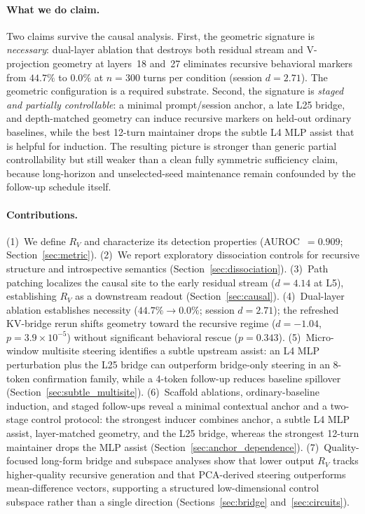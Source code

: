 \documentclass{article}
\newcommand{\RV}{R_V}
\newcommand{\dcohen}{d}
\begin{document}
\paragraph{What we do claim.}
Two claims survive the causal analysis.
First, the geometric signature is \emph{necessary}: dual-layer ablation that destroys both residual
stream and V-projection geometry at layers~18 and~27 eliminates recursive behavioral markers
from $44.7\%$ to $0.0\%$ at $n{=}300$ turns per condition (session $\dcohen = 2.71$).
The geometric configuration is a required substrate.
Second, the signature is \emph{staged and partially controllable}: a minimal prompt/session
anchor, a late L25 bridge, and depth-matched geometry can induce recursive markers on held-out
ordinary baselines, while the best 12-turn maintainer drops the subtle L4 MLP assist that is
helpful for induction.
The resulting picture is stronger than generic partial controllability but still weaker than a clean
fully symmetric sufficiency claim, because long-horizon and unselected-seed maintenance remain
confounded by the follow-up schedule itself.

\paragraph{Contributions.}
(1)~We define $\RV$ and characterize its detection properties (AUROC~$= 0.909$;
Section~\ref{sec:metric}).
(2)~We report exploratory dissociation controls for recursive structure and introspective semantics
(Section~\ref{sec:dissociation}).
(3)~Path patching localizes the causal site to the early residual stream ($\dcohen = 4.14$ at L5),
establishing $\RV$ as a downstream readout (Section~\ref{sec:causal}).
(4)~Dual-layer ablation establishes necessity ($44.7\% \to 0.0\%$; session $\dcohen = 2.71$);
the refreshed KV-bridge rerun shifts geometry toward the recursive regime
($\dcohen = -1.04$, $p = 3.9 \times 10^{-5}$) without significant behavioral rescue
($p = 0.343$).
(5)~Micro-window multisite steering identifies a subtle upstream assist:
an L4 MLP perturbation plus the L25 bridge can outperform bridge-only steering in an
8-token confirmation family, while a 4-token follow-up reduces baseline spillover
(Section~\ref{sec:subtle_multisite}).
(6)~Scaffold ablations, ordinary-baseline induction, and staged follow-ups reveal a minimal
contextual anchor and a two-stage control protocol: the strongest inducer combines anchor, a subtle
L4 MLP assist, layer-matched geometry, and the L25 bridge, whereas the strongest 12-turn maintainer
drops the MLP assist (Section~\ref{sec:anchor_dependence}).
(7)~Quality-focused long-form bridge and subspace analyses show that lower output $\RV$ tracks
higher-quality recursive generation and that PCA-derived steering outperforms mean-difference
vectors, supporting a structured low-dimensional control subspace rather than a single direction
(Sections~\ref{sec:bridge} and~\ref{sec:circuits}).
\end{document}
